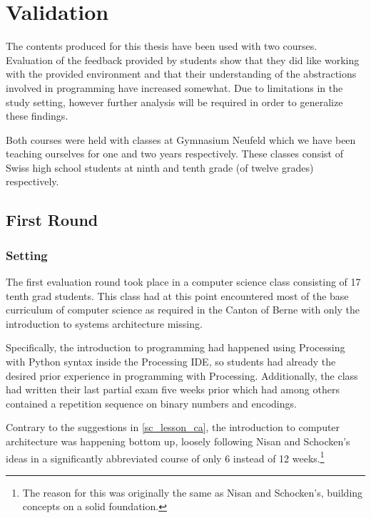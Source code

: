 
\chapter{Validation} \label{ch_practice}

The contents produced for this thesis have been used with two courses. Evaluation of the feedback provided by students show that they did like working with the provided environment and that their understanding of the abstractions involved in programming have increased somewhat. Due to limitations in the study setting, however further analysis will be required in order to generalize these findings.

Both courses were held with classes at Gymnasium Neufeld which we have been teaching ourselves for one and two years respectively. These classes consist of Swiss high school students at ninth and tenth grade (of twelve grades) respectively.


\section{First Round} \label{sc_validation_ca} %

\subsection{Setting}

The first evaluation round took place in a computer science class consisting of 17 tenth grad students. This class had at this point encountered most of the base curriculum of computer science as required in the Canton of Berne \cite[p.\,145--146]{Erz16} with only the introduction to systems architecture missing.

Specifically, the introduction to programming had happened using Processing with Python syntax inside the Processing \ac{IDE}, so students had already the desired prior experience in programming with Processing. Additionally, the class had written their last partial exam five weeks prior which had among others contained a repetition sequence on binary numbers and encodings.

Contrary to the suggestions in \ref{sc_lesson_ca}, the introduction to computer architecture was happening bottom up, loosely following Nisan and Schocken's ideas \cite{Nis21} in a significantly abbreviated course of only 6 instead of 12 weeks.\footnote{The reason for this was originally the same as Nisan and Schocken's, \ie building concepts on a solid foundation.}

